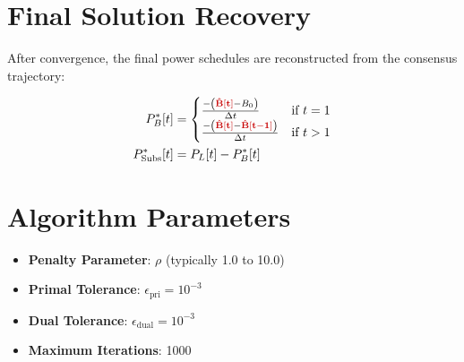 \documentclass[11pt]{article}
\newcommand{\redBhat}[1]{\textcolor{redvar}{\mathbf{#1}}}     %
\begin{document}
\section{Final Solution Recovery}

After convergence, the final power schedules are reconstructed from the consensus trajectory:

\begin{align}
P_{B}^*[t] &= 
\begin{cases}
\frac{-\left(\redBhat{\hat{B}[t]} - B_0\right)}{\Delta t} & \text{if } t = 1 \\
\frac{-\left(\redBhat{\hat{B}[t]} - \redBhat{\hat{B}[t-1]}\right)}{\Delta t} & \text{if } t > 1
\end{cases} \\
P_{\text{Subs}}^*[t] &= P_L[t] - P_{B}^*[t]
\end{align}

\section{Algorithm Parameters}

\begin{itemize}
    \item \textbf{Penalty Parameter}: $\rho$ (typically 1.0 to 10.0)
    \item \textbf{Primal Tolerance}: $\epsilon_{\text{pri}} = 10^{-3}$
    \item \textbf{Dual Tolerance}: $\epsilon_{\text{dual}} = 10^{-3}$
    \item \textbf{Maximum Iterations}: 1000
\end{itemize}
\end{document}
